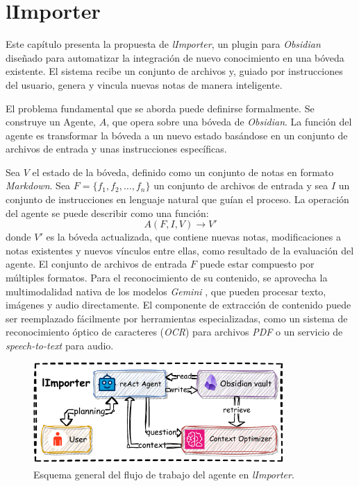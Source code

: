 \chapter{lImporter}\label{chapter:proposal}
Este capítulo presenta la propuesta de \textit{lImporter}, un plugin para \textit{Obsidian} diseñado para automatizar la integración de nuevo conocimiento en una bóveda existente. El sistema recibe un conjunto de archivos y, guiado por instrucciones del usuario, genera y vincula nuevas notas de manera inteligente.

El problema fundamental que se aborda puede definirse formalmente. Se construye un Agente, $A$, que opera sobre una bóveda de \textit{Obsidian}. La función del agente es transformar la bóveda a un nuevo estado basándose en un conjunto de archivos de entrada y unas instrucciones específicas.

Sea $V$ el estado de la bóveda, definido como un conjunto de notas en formato \textit{Markdown}. Sea $F = \{f_1, f_2, \dots, f_n\}$ un conjunto de archivos de entrada y sea $I$ un conjunto de instrucciones en lenguaje natural que guían el proceso. La operación del agente se puede describir como una función:
\[ A(F, I, V) \rightarrow V' \]
donde $V'$ es la bóveda actualizada, que contiene nuevas notas, modificaciones a notas existentes y nuevos vínculos entre ellas, como resultado de la evaluación del agente. El conjunto de archivos de entrada $F$ puede estar compuesto por múltiples formatos. Para el reconocimiento de su contenido, se aprovecha la multimodalidad nativa de los modelos \textit{Gemini} \parencite{teamGeminiFamilyHighly2024}, que pueden procesar texto, imágenes y audio directamente. El componente de extracción de contenido puede ser reemplazado fácilmente por herramientas especializadas, como un sistema de reconocimiento óptico de caracteres (\textit{OCR}) para archivos \textit{PDF} o un servicio de \textit{speech-to-text} para audio.

\begin{figure}[h]
    \centering
    \includegraphics[width=0.85\textwidth]{figures/limporter.pdf}
    \caption{Esquema general del flujo de trabajo del agente en \textit{lImporter}.}
    \label{fig:importer_schema}
\end{figure}


